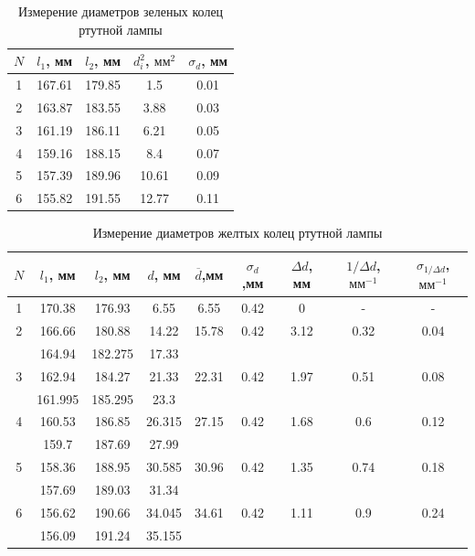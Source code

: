 \documentclass[12pt]{kiarticle} %
\begin{document}
			\begin{table}[]
			\caption{Измерение диаметров зеленых колец ртутной лампы}
			\begin{center}
				\begin{tabular}{|c|c|c|c|c|}
					\hline
					$ N $ & $ l_1 $, мм & $ l_2 $, мм & $ d_i^2 $, $ мм^2 $ & $ \sigma_d $, мм\\
					\hline
					 1 & 167.61 & 179.85 & 1.5 & 0.01 \\
					2 & 163.87 & 183.55 & 3.88 & 0.03 \\
					3 & 161.19 & 186.11 & 6.21 & 0.05 \\
					4 & 159.16 & 188.15 & 8.4 & 0.07 \\
					5 & 157.39 & 189.96 & 10.61 & 0.09 \\
					6 & 155.82 & 191.55 & 12.77 & 0.11 \\
					\hline
				\end{tabular}
			\end{center}
			\label{Gr_table}
		\end{table}
	
	\begin{table}[]
		\caption{Измерение диаметров желтых колец ртутной лампы}
		\begin{center}
			\begin{tabular}{|c|c|c|c|c|c|c|c|c|}
				\hline
					$ N $ & $ l_1 $, мм & $ l_2 $, мм & $ d $, мм & $ \overline{d} $,мм &  $ \sigma_d $,мм & $ \Delta d $, мм  &  $ 1/\Delta d $,$ мм^{-1} $ & $ \sigma_{1/\Delta d} $,$ мм^{-1} $\\
					\hline
			1 & 170.38 & 176.93 & 6.55 & 6.55 & 0.42 & 0 & - & - \\
			2 & 166.66 & 180.88 & 14.22 & 15.78 & 0.42 & 3.12 & 0.32 & 0.04 \\
			\text{} & 164.94 & 182.275 & 17.33 & \text{} & \text{} & \text{} & \text{} & \text{} \\
			
			3 & 162.94 & 184.27 & 21.33 & 22.31 & 0.42 & 1.97 & 0.51 & 0.08 \\
			\text{} & 161.995 & 185.295 & 23.3 & \text{} & \text{} & \text{} & \text{} & \text{} \\
			4 & 160.53 & 186.85 & 26.315 & 27.15 & 0.42 & 1.68 & 0.6 & 0.12 \\
			\text{} & 159.7 & 187.69 & 27.99 & \text{} & \text{} & \text{} & \text{} & \text{} \\
			5 & 158.36 & 188.95 & 30.585 & 30.96 & 0.42 & 1.35 & 0.74 & 0.18 \\
			\text{} & 157.69 & 189.03 & 31.34 & \text{} & \text{} & \text{} & \text{} & \text{} \\
			6 & 156.62 & 190.66 & 34.045 & 34.61 & 0.42 & 1.11 & 0.9 & 0.24 \\
			\text{} & 156.09 & 191.24 & 35.155 & \text{} & \text{} & \text{} & \text{} & \text{} \\
				\hline
			\end{tabular}
		\end{center}
		\label{Ye_table}
	\end{table}
\end{document}
